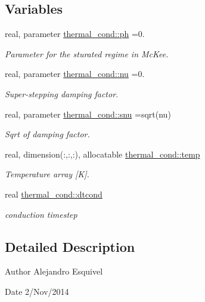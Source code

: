 \subsection*{Variables}
\begin{DoxyCompactItemize}
\item 
\hypertarget{namespacethermal__cond_a37c3e000231baaaa4668f7c05f021ce0}{}real, parameter \hyperlink{namespacethermal__cond_a37c3e000231baaaa4668f7c05f021ce0}{thermal\+\_\+cond\+::ph} =0.\label{namespacethermal__cond_a37c3e000231baaaa4668f7c05f021ce0}

\begin{DoxyCompactList}\small\item\em Parameter for the sturated regime in Mc\+Kee. \end{DoxyCompactList}\item 
\hypertarget{namespacethermal__cond_a38896e6bbd3b053ca066e407e4b3817f}{}real, parameter \hyperlink{namespacethermal__cond_a38896e6bbd3b053ca066e407e4b3817f}{thermal\+\_\+cond\+::nu} =0.\label{namespacethermal__cond_a38896e6bbd3b053ca066e407e4b3817f}

\begin{DoxyCompactList}\small\item\em Super-\/stepping damping factor. \end{DoxyCompactList}\item 
\hypertarget{namespacethermal__cond_a53b14d15ce11990f6453a335c81d1728}{}real, parameter \hyperlink{namespacethermal__cond_a53b14d15ce11990f6453a335c81d1728}{thermal\+\_\+cond\+::snu} =sqrt(nu)\label{namespacethermal__cond_a53b14d15ce11990f6453a335c81d1728}

\begin{DoxyCompactList}\small\item\em Sqrt of damping factor. \end{DoxyCompactList}\item 
\hypertarget{namespacethermal__cond_a35e92d8dd3107b43d3326f014577fa9e}{}real, dimension(\+:,\+:,\+:), allocatable \hyperlink{namespacethermal__cond_a35e92d8dd3107b43d3326f014577fa9e}{thermal\+\_\+cond\+::temp}\label{namespacethermal__cond_a35e92d8dd3107b43d3326f014577fa9e}

\begin{DoxyCompactList}\small\item\em Temperature array \mbox{[}K\mbox{]}. \end{DoxyCompactList}\item 
\hypertarget{namespacethermal__cond_a59c290133a4485e731bfc0185d006091}{}real \hyperlink{namespacethermal__cond_a59c290133a4485e731bfc0185d006091}{thermal\+\_\+cond\+::dtcond}\label{namespacethermal__cond_a59c290133a4485e731bfc0185d006091}

\begin{DoxyCompactList}\small\item\em conduction timestep \end{DoxyCompactList}\end{DoxyCompactItemize}


\subsection{Detailed Description}
\begin{DoxyAuthor}{Author}
Alejandro Esquivel 
\end{DoxyAuthor}
\begin{DoxyDate}{Date}
2/\+Nov/2014 
\end{DoxyDate}
